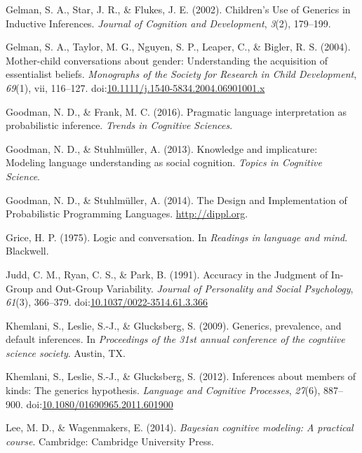 \documentclass[floatsintext,doc]{apa6}
\begin{document}
\leavevmode\hypertarget{ref-Gelman2002}{}%
Gelman, S. A., Star, J. R., \& Flukes, J. E. (2002). Children's Use of Generics in Inductive Inferences. \emph{Journal of Cognition and Development}, \emph{3}(2), 179--199.

\leavevmode\hypertarget{ref-GelmanEtAl2004}{}%
Gelman, S. A., Taylor, M. G., Nguyen, S. P., Leaper, C., \& Bigler, R. S. (2004). Mother-child conversations about gender: Understanding the acquisition of essentialist beliefs. \emph{Monographs of the Society for Research in Child Development}, \emph{69}(1), vii, 116--127. doi:\href{https://doi.org/10.1111/j.1540-5834.2004.06901001.x}{10.1111/j.1540-5834.2004.06901001.x}

\leavevmode\hypertarget{ref-Goodman2016}{}%
Goodman, N. D., \& Frank, M. C. (2016). Pragmatic language interpretation as probabilistic inference. \emph{Trends in Cognitive Sciences}.

\leavevmode\hypertarget{ref-Goodman2013}{}%
Goodman, N. D., \& Stuhlmüller, A. (2013). Knowledge and implicature: Modeling language understanding as social cognition. \emph{Topics in Cognitive Science}.

\leavevmode\hypertarget{ref-dippl}{}%
Goodman, N. D., \& Stuhlmüller, A. (2014). The Design and Implementation of Probabilistic Programming Languages. \url{http://dippl.org}.

\leavevmode\hypertarget{ref-Grice1975}{}%
Grice, H. P. (1975). Logic and conversation. In \emph{Readings in language and mind}. Blackwell.

\leavevmode\hypertarget{ref-Judd1991}{}%
Judd, C. M., Ryan, C. S., \& Park, B. (1991). Accuracy in the Judgment of In-Group and Out-Group Variability. \emph{Journal of Personality and Social Psychology}, \emph{61}(3), 366–379. doi:\href{https://doi.org/10.1037/0022-3514.61.3.366}{10.1037/0022-3514.61.3.366}

\leavevmode\hypertarget{ref-Khemlani2009}{}%
Khemlani, S., Leslie, S.-J., \& Glucksberg, S. (2009). Generics, prevalence, and default inferences. In \emph{Proceedings of the 31st annual conference of the cogntiive science society}. Austin, TX.

\leavevmode\hypertarget{ref-Khemlani2012}{}%
Khemlani, S., Leslie, S.-J., \& Glucksberg, S. (2012). Inferences about members of kinds: The generics hypothesis. \emph{Language and Cognitive Processes}, \emph{27}(6), 887--900. doi:\href{https://doi.org/10.1080/01690965.2011.601900}{10.1080/01690965.2011.601900}

\leavevmode\hypertarget{ref-LeeWagenmakers2014}{}%
Lee, M. D., \& Wagenmakers, E. (2014). \emph{Bayesian cognitive modeling: A practical course}. Cambridge: Cambridge University Press.
\end{document}
